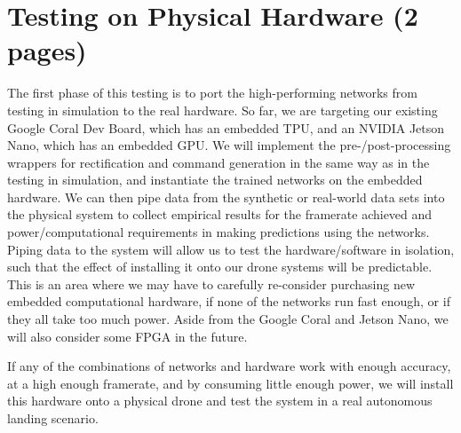 \section{Testing on Physical Hardware (2 pages)}

The first phase of this testing is to port the high-performing networks from testing in simulation to the real hardware.
So far, we are targeting our existing Google Coral Dev Board, which has an embedded TPU,
and an NVIDIA Jetson Nano, which has an embedded GPU.
We will implement the pre-/post-processing wrappers for rectification and command generation in the same way as in the testing in simulation,
and instantiate the trained networks on the embedded hardware.
We can then pipe data from the synthetic or real-world data sets into the physical system
to collect empirical results
for the framerate achieved and power/computational requirements in making predictions
using the networks.
Piping data to the system will allow us to test the hardware/software in isolation,
such that the effect of installing it onto our drone systems will be predictable.
This is an area where we may have to carefully re-consider purchasing new embedded computational
hardware, if none of the networks run fast enough, or if they all take too much power.
Aside from the Google Coral and Jetson Nano, we will also consider some FPGA in the future.

If any of the combinations of networks and hardware work with enough accuracy,
at a high enough framerate, and by consuming little enough power,
we will install this hardware onto a physical drone and test the system in a real
autonomous landing scenario.